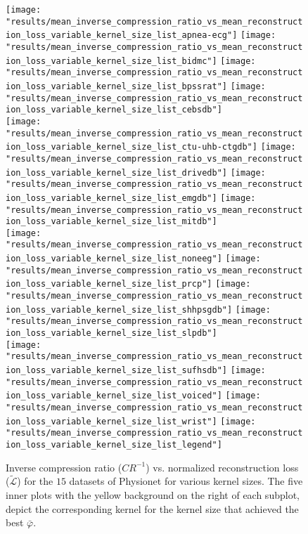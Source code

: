 \documentclass[journal]{IEEEtran}
\begin{document}
\begin{figure*}[!t]
	\texttt{[image: "results/mean\_inverse\_compression\_ratio\_vs\_mean\_reconstruction\_loss\_variable\_kernel\_size\_list\_apnea-ecg"]}
	\texttt{[image: "results/mean\_inverse\_compression\_ratio\_vs\_mean\_reconstruction\_loss\_variable\_kernel\_size\_list\_bidmc"]}
	\texttt{[image: "results/mean\_inverse\_compression\_ratio\_vs\_mean\_reconstruction\_loss\_variable\_kernel\_size\_list\_bpssrat"]}
	\texttt{[image: "results/mean\_inverse\_compression\_ratio\_vs\_mean\_reconstruction\_loss\_variable\_kernel\_size\_list\_cebsdb"]}
	\\
	\texttt{[image: "results/mean\_inverse\_compression\_ratio\_vs\_mean\_reconstruction\_loss\_variable\_kernel\_size\_list\_ctu-uhb-ctgdb"]}
	\texttt{[image: "results/mean\_inverse\_compression\_ratio\_vs\_mean\_reconstruction\_loss\_variable\_kernel\_size\_list\_drivedb"]}
	\texttt{[image: "results/mean\_inverse\_compression\_ratio\_vs\_mean\_reconstruction\_loss\_variable\_kernel\_size\_list\_emgdb"]}
	\texttt{[image: "results/mean\_inverse\_compression\_ratio\_vs\_mean\_reconstruction\_loss\_variable\_kernel\_size\_list\_mitdb"]}
	\\
	\texttt{[image: "results/mean\_inverse\_compression\_ratio\_vs\_mean\_reconstruction\_loss\_variable\_kernel\_size\_list\_noneeg"]}
	\texttt{[image: "results/mean\_inverse\_compression\_ratio\_vs\_mean\_reconstruction\_loss\_variable\_kernel\_size\_list\_prcp"]}
	\texttt{[image: "results/mean\_inverse\_compression\_ratio\_vs\_mean\_reconstruction\_loss\_variable\_kernel\_size\_list\_shhpsgdb"]}
	\texttt{[image: "results/mean\_inverse\_compression\_ratio\_vs\_mean\_reconstruction\_loss\_variable\_kernel\_size\_list\_slpdb"]}
	\\
	\texttt{[image: "results/mean\_inverse\_compression\_ratio\_vs\_mean\_reconstruction\_loss\_variable\_kernel\_size\_list\_sufhsdb"]}
	\texttt{[image: "results/mean\_inverse\_compression\_ratio\_vs\_mean\_reconstruction\_loss\_variable\_kernel\_size\_list\_voiced"]}
	\texttt{[image: "results/mean\_inverse\_compression\_ratio\_vs\_mean\_reconstruction\_loss\_variable\_kernel\_size\_list\_wrist"]}
	\texttt{[image: "results/mean\_inverse\_compression\_ratio\_vs\_mean\_reconstruction\_loss\_variable\_kernel\_size\_list\_legend"]}
	\caption{Inverse compression ratio ($CR^{-1}$) vs. normalized reconstruction loss ($\tilde{\mathcal{L}}$) for the $15$ datasets of Physionet for various kernel sizes.
	The five inner plots with the yellow background on the right of each subplot, depict the corresponding kernel for the kernel size that achieved the best $\bar\varphi$.}
	\label{fig:crrl}
\end{figure*}
\end{document}
